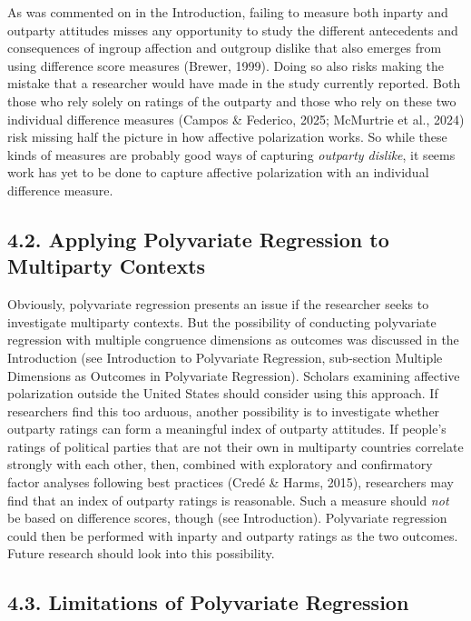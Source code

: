 \documentclass[authordate, meta, issue]{jote-new-article}
\begin{document}
	As was commented on in the Introduction, failing to measure both inparty and outparty attitudes misses any opportunity to study the different antecedents and consequences of ingroup affection and outgroup dislike that also emerges from using difference score measures (Brewer, 1999). Doing so also risks making the mistake that a researcher would have made in the study currently reported. Both those who rely solely on ratings of the outparty and those who rely on these two individual difference measures (Campos \& Federico, 2025; McMurtrie et al., 2024) risk missing half the picture in how affective polarization works. So while these kinds of measures are probably good ways of capturing \emph{outparty dislike}, it seems work has yet to be done to capture affective polarization with an individual difference measure.



	\subsection{4.2. Applying Polyvariate Regression to Multiparty Contexts}



	Obviously, polyvariate regression presents an issue if the researcher seeks to investigate multiparty contexts. But the possibility of conducting polyvariate regression with multiple congruence dimensions as outcomes was discussed in the Introduction (see Introduction to Polyvariate Regression, sub-section Multiple Dimensions as Outcomes in Polyvariate Regression). Scholars examining affective polarization outside the United States should consider using this approach. If researchers find this too arduous, another possibility is to investigate whether outparty ratings can form a meaningful index of outparty attitudes. If people's ratings of political parties that are not their own in multiparty countries correlate strongly with each other, then, combined with exploratory and confirmatory factor analyses following best practices (Credé \& Harms, 2015), researchers may find that an index of outparty ratings is reasonable. Such a measure should \emph{not }be based on difference scores, though (see Introduction). Polyvariate regression could then be performed with inparty and outparty ratings as the two outcomes. Future research should look into this possibility.



	\subsection{4.3. Limitations of Polyvariate Regression}
\end{document}
